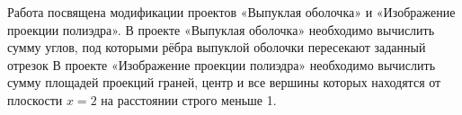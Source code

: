 Работа посвящена модификации проектов «Выпуклая оболочка» и
«Изображение проекции полиэдра». В проекте  «Выпуклая оболочка» необходимо вычислить сумму углов, под которыми рёбра выпуклой оболочки пересекают заданный отрезок
В проекте «Изображение проекции полиэдра» необходимо вычислить сумму площадей проекций граней, центр и все вершины которых находятся от плоскости $\mathit x = 2$ на расстоянии строго меньше 1.
